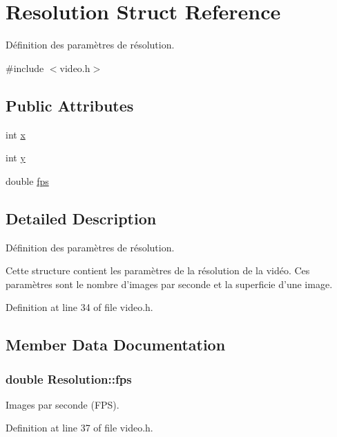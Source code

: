 \hypertarget{structResolution}{\section{Resolution Struct Reference}
\label{structResolution}
}


Définition des paramètres de résolution.  




{\ttfamily \#include $<$video.\-h$>$}

\subsection*{Public Attributes}
\begin{DoxyCompactItemize}
\item 
int \hyperlink{structResolution_a6aff06d878fdbd0bbb681e02adc94c0f}{x}
\item 
int \hyperlink{structResolution_a68fe6f35cf8c0e03898a2d9888dd3d0d}{y}
\item 
double \hyperlink{structResolution_ab05f2e3ea2a304b4fabb8970405b4d46}{fps}
\end{DoxyCompactItemize}


\subsection{Detailed Description}
Définition des paramètres de résolution. 

Cette structure contient les paramètres de la résolution de la vidéo. Ces paramètres sont le nombre d'images par seconde et la superficie d'une image. 

Definition at line 34 of file video.\-h.



\subsection{Member Data Documentation}
\hypertarget{structResolution_ab05f2e3ea2a304b4fabb8970405b4d46}{
\subsubsection[{fps}]{\setlength{\rightskip}{0pt plus 5cm}double Resolution\-::fps}}\label{structResolution_ab05f2e3ea2a304b4fabb8970405b4d46}
Images par seconde (F\-P\-S). 

Definition at line 37 of file video.\-h.

